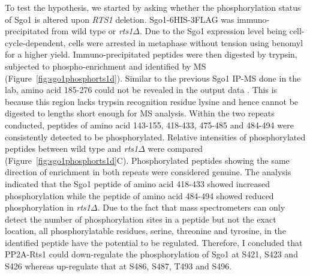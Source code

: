 To test the hypothesis, we started by asking whether the phosphorylation status of Sgo1 is altered upon \textit{RTS1} deletion. Sgo1-6HIS-3FLAG was immuno-precipitated from wild type or \textit{rts1$\Delta$}. Due to the Sgo1 expression level being cell-cycle-dependent, cells were arrested in metaphase without tension using benomyl for a higher yield. Immuno-precipitated peptides were then digested by trypsin, subjected to phospho-enrichment and identified by MS (Figure~\ref{fig:sgo1phosphorts1d}). Similar to the previous Sgo1 IP-MS done in the lab, amino acid 185-276 could not be revealed in the output data \citep{Barton2019MechanismsCerevisiae}. This is because this region lacks trypsin recognition residue lysine and hence cannot be digested to lengths short enough for MS analysis. Within the two repeats conducted, peptides of amino acid 143-155, 418-433, 475-485 and 484-494 were consistently detected to be phosphorylated. Relative intensities of phosphorylated peptides between wild type and \textit{rts1$\Delta$} were compared (Figure~\ref{fig:sgo1phosphorts1d}C). Phosphorylated peptides showing the same direction of enrichment in both repeats were considered genuine. The analysis indicated that the Sgo1 peptide of amino acid 418-433 showed increased phosphorylation while the peptide of amino acid 484-494 showed reduced phosphorylation in \textit{rts1$\Delta$}. Due to the fact that mass spectrometers can only detect the number of phosphorylation sites in a peptide but not the exact location, all phosphorylatable residues, serine, threonine and tyrosine, in the identified peptide have the potential to be regulated. Therefore, I concluded that PP2A-Rts1 could down-regulate the phosphorylation of Sgo1 at S421, S423 and S426 whereas up-regulate that at S486, S487, T493 and S496. 

